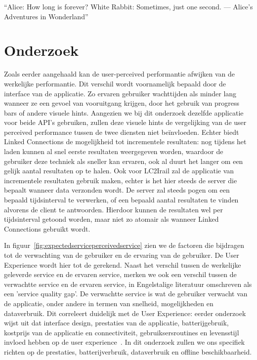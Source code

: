 \begin{savequote}[0.55\linewidth]
	``Alice: How long is forever? White Rabbit: Sometimes, just one second. —  Alice's Adventures in Wonderland''
\end{savequote}

\chapter{Onderzoek}

\label{chap:onderzoek}
Zoals eerder aangehaald kan de user-perceived performantie afwijken van de werkelijke performantie. Dit verschil wordt voornamelijk bepaald door de interface van de applicatie. Zo ervaren gebruiker wachttijden als minder lang wanneer ze een gevoel van vooruitgang krijgen, door het gebruik van progress bars of andere visuele hints. Aangezien we bij dit onderzoek dezelfde applicatie voor beide API's gebruiken, zullen deze visuele hints de vergelijking van de user perceived performance tussen de twee diensten niet beïnvloeden. Echter biedt Linked Connections de mogelijkheid tot incrementele resultaten: nog tijdens het laden kunnen al snel eerste resultaten weergegeven worden, waardoor de gebruiker deze techniek als sneller kan ervaren, ook al duurt het langer om een gelijk aantal resultaten op te halen. Ook voor LC2Irail zal de applicatie van incrementele resultaten gebruik maken, echter is het hier steeds de server die bepaalt wanneer data verzonden wordt. De server zal steeds pogen om een bepaald tijdsinterval te verwerken, of een bepaald aantal resultaten te vinden alvorens de client te antwoorden. Hierdoor kunnen de resultaten wel per tijdsinterval getoond worden, maar niet zo atomair als wanneer Linked Connections gebruikt wordt.

In figuur~\ref{fig:expectedserviceperceivedservice} zien we de factoren die bijdragen tot de verwachting van de gebruiker en de ervaring van de gebruiker. De User Experience wordt hier tot de  gerekend. Naast het verschil tussen de werkelijke geleverde service en de ervaren service, merken we ook een verschil tussen de verwachtte service en de ervaren service, in Engelstalige literatuur omschreven als een 'service quality gap'. De verwachtte service is wat de gebruiker verwacht van de applicatie, onder andere in termen van snelheid, mogelijkheden en dataverbruik. Dit correleert duidelijk met de User Experience: eerder onderzoek wijst uit dat interface design, prestaties van de applicatie, batterijgebruik, kostprijs van de applicatie en connectiviteit, gebruiksersroutines en levensstijl invloed hebben op de user experience~\citep{ickin12}. In dit onderzoek zullen we ons specifiek richten op de prestaties, batterijverbruik, dataverbruik en  offline beschikbaarheid.

